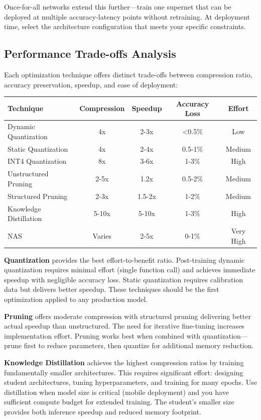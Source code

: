 Once-for-all networks extend this further---train one supernet that can be deployed at multiple accuracy-latency points without retraining. At deployment time, select the architecture configuration that meets your specific constraints.

\subsection{Performance Trade-offs Analysis}

Each optimization technique offers distinct trade-offs between compression ratio, accuracy preservation, speedup, and ease of deployment:

\begin{table}[h]
\centering
\small
\begin{tabular}{lcccc}
\toprule
\textbf{Technique} & \textbf{Compression} & \textbf{Speedup} & \textbf{Accuracy Loss} & \textbf{Effort} \\
\midrule
Dynamic Quantization & 4x & 2-3x & <0.5\% & Low \\
Static Quantization & 4x & 2-4x & 0.5-1\% & Medium \\
INT4 Quantization & 8x & 3-6x & 1-3\% & High \\
Unstructured Pruning & 2-5x & 1.2x & 0.5-2\% & Medium \\
Structured Pruning & 2-3x & 1.5-2x & 1-2\% & Medium \\
Knowledge Distillation & 5-10x & 5-10x & 1-3\% & High \\
NAS & Varies & 2-5x & 0-1\% & Very High \\
\bottomrule
\end{tabular}
\end{table}

\textbf{Quantization} provides the best effort-to-benefit ratio. Post-training dynamic quantization requires minimal effort (single function call) and achieves immediate speedup with negligible accuracy loss. Static quantization requires calibration data but delivers better speedup. These techniques should be the first optimization applied to any production model.

\textbf{Pruning} offers moderate compression with structured pruning delivering better actual speedup than unstructured. The need for iterative fine-tuning increases implementation effort. Pruning works best when combined with quantization---prune first to reduce parameters, then quantize for additional memory reduction.

\textbf{Knowledge Distillation} achieves the highest compression ratios by training fundamentally smaller architectures. This requires significant effort: designing student architectures, tuning hyperparameters, and training for many epochs. Use distillation when model size is critical (mobile deployment) and you have sufficient compute budget for extended training. The student's smaller size provides both inference speedup and reduced memory footprint.

